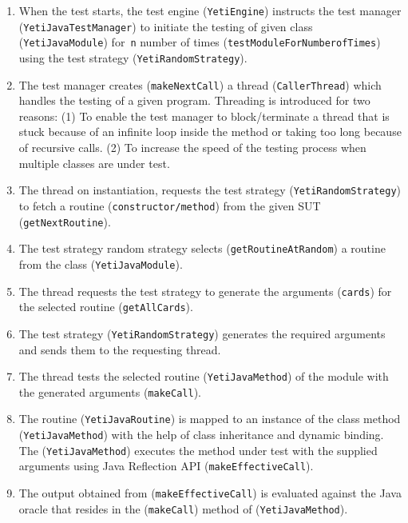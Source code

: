\begin{enumerate}
\item When the test starts, the test engine (\verb+YetiEngine+) instructs the test manager (\verb+YetiJavaTestManager+) to initiate the testing of given class (\verb+YetiJavaModule+) for~\verb+n+ number of times (\verb+testModuleForNumberofTimes+) using the test strategy (\verb+YetiRandomStrategy+).

\item The test manager creates (\verb+makeNextCall+) a thread (\verb+CallerThread+) which handles the testing of a given program. Threading is introduced for two reasons: (1) To enable the test manager to block/terminate a thread that is stuck because of an infinite loop inside the method or taking too long because of recursive calls. (2) To increase the speed of the testing process when multiple classes are under test.

\item The thread on instantiation, requests the test strategy (\verb+YetiRandomStrategy+) to fetch a routine (\verb+constructor/method+) from the given SUT (\verb+getNextRoutine+).

\item The test strategy random strategy selects (\verb+getRoutineAtRandom+) a routine from the class (\verb+YetiJavaModule+).

\item The thread requests the test strategy to generate the arguments (\verb+cards+) for the selected routine (\verb+getAllCards+).

 \item The test strategy (\verb+YetiRandomStrategy+) generates the required arguments and sends them to the requesting thread.
 
 \item The thread tests the selected routine (\verb+YetiJavaMethod+) of the module with the generated arguments (\verb+makeCall+).
 
 \item The routine (\verb+YetiJavaRoutine+) is mapped to an instance of the class method (\verb+YetiJavaMethod+) with the help of class inheritance and dynamic binding. The (\verb+YetiJavaMethod+) executes the method under test with the supplied arguments using Java Reflection API (\verb+makeEffectiveCall+).
 
\item The output obtained from (\verb+makeEffectiveCall+) is evaluated against the Java oracle that resides in the (\verb+makeCall+) method of (\verb+YetiJavaMethod+).

\end{enumerate}



